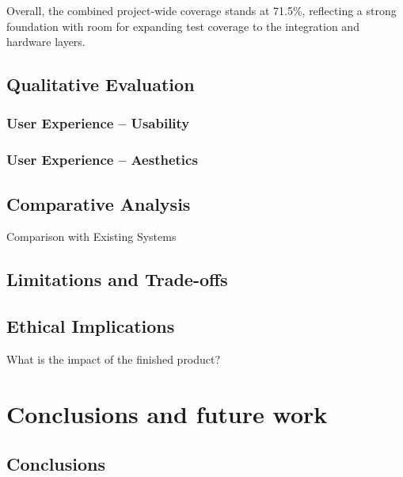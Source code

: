                 Overall, the combined project-wide coverage stands at 71.5\%, reflecting a strong foundation with room for expanding test coverage to the integration and hardware layers.
    
        \subsection{Qualitative Evaluation}
        
            \subsubsection{User Experience -- Usability}
    
            \subsubsection{User Experience -- Aesthetics}
            
        \subsection{Comparative Analysis}
            \begin{temp}
                Comparison with Existing Systems
            \end{temp}
    
        \subsection{Limitations and Trade-offs}
    
        \subsection{Ethical Implications}
            \begin{temp}
                What is the impact of the finished product?
            \end{temp}
    
    \section{Conclusions and future work} %
        \subsection{Conclusions}
        
